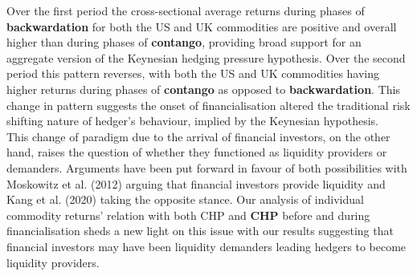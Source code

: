 \documentclass[]{elsarticle} %
\begin{document}
\medskip\setlength{\parindent}{0pt}

Over the first period the cross-sectional average returns during phases of \textbf{backwardation} for both the US and UK commodities are positive and overall higher than during phases of \textbf{contango}, providing broad support for an aggregate version of the Keynesian hedging pressure hypothesis. Over the second period this pattern reverses, with both the US and UK commodities having higher returns during phases of \textbf{contango} as opposed to \textbf{backwardation}. This change in pattern suggests the onset of financialisation altered the traditional risk shifting nature of hedger's behaviour, implied by the Keynesian hypothesis.\\
This change of paradigm due to the arrival of financial investors, on the other hand, raises the question of whether they functioned as liquidity providers or demanders. Arguments have been put forward in favour of both possibilities with Moskowitz et al. (2012) arguing that financial investors provide liquidity and Kang et al. (2020) taking the opposite stance. Our analysis of individual commodity returns' relation with both CHP and \textbf{CHP} before and during financialisation sheds a new light on this issue with our results suggesting that financial investors may have been liquidity demanders leading hedgers to become liquidity providers.

\medskip\setlength{\parindent}{0pt}
\end{document}
